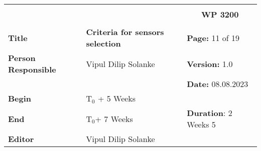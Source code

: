 \begin{table}[!h]
  \begin{center}
    \begin{tabular}{|p{35mm}||p{55mm}|p{50mm}||p{40mm}|}
      \hline
      \multicolumn{3}{|l||}{\textbf{}} & \multicolumn{1}{c|}{}                                                                                                                                                \\
      \multicolumn{3}{|l||}{\textbf{}} & \multicolumn{1}{c|}{\textbf{WP 3200}}                                                                                                                                \\
      \multicolumn{3}{|l||}{\textbf{}} & \multicolumn{1}{c|}{}                                                                                                                                                \\
      \hline\hline
      \textbf{Title}                   & \multicolumn{2}{p{7cm}||}{\textbf{Criteria for sensors selection}}
                                       & \textbf{Page:} 11 of 19                                                                                                                                            \\
      \hline
      \textbf{Person Responsible}        & \multicolumn{2}{l||}{Vipul Dilip Solanke}                                                                                                   & \textbf{Version:} 1.0   \\
      \hline
      \multicolumn{3}{|l||}{}          & \textbf{Date:} 08.08.2023                                                                                                                                          \\
      \hline\hline
      \textbf{Begin}                  & \multicolumn{2}{l||}{T$_0$ + 5 Weeks}                                                                                                                &                         \\
      \hline
      \textbf{End}                    & \multicolumn{2}{l||}{T$_0$+ 7 Weeks}                                                                                                        & \textbf{Duration}: 2 Weeks 5 \\
      \hline\hline
      \textbf{Editor}              & \multicolumn{3}{l|}{Vipul Dilip Solanke}                                                                                                                              \\

\end{tabular}
\end{center}
\end{table}
